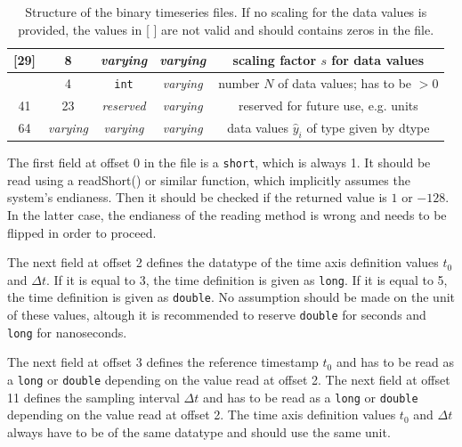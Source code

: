 \documentclass[a4paper,10pt]{article}
\begin{document}
\begin{table}[htbp]
\begin{tabular}{|c|c|c|c|c|}
    [29]    & 8                & \textit{varying}                 & \textit{varying}       & scaling factor $s$ for data values \\
    \hline                                                                                        
    [37]    & 4                & \texttt{int}                     & \textit{varying}       & number $N$ of data values; has to be $>0$ \\
    \hline
    41      & 23               & \textit{reserved}                & \textit{varying}       & reserved for future use, e.g. units \\
    \hline                                                                                        
    64      & \textit{varying} & \textit{varying}                 &\textit{varying}        & data values $\hat{y}_i$ of type given by dtype \\
    \hline
 \end{tabular}
 \caption{Structure of the binary timeseries files. If no scaling for the data values is provided, the values in [ ] are not valid and should contains zeros in the file.}
 \label{tab:structure}
\end{table}

The first field at offset 0 in the file is a \texttt{short}, which is always 1.
It should be read using a readShort() or similar function, which implicitly assumes the system's endianess.
Then it should be checked if the returned value is $1$ or $-128$. In the latter case,
the endianess of the reading method is wrong and needs to be flipped in order to proceed.

The next field at offset 2 defines the datatype of the time axis definition values $t_0$ and $\Delta t$.
If it is equal to 3, the time definition is given as \texttt{long}.
If it is equal to 5, the time definition is given as \texttt{double}.
No assumption should be made on the unit of these values, altough it is recommended to reserve \texttt{double} for seconds and
\texttt{long} for nanoseconds.

The next field at offset 3 defines the reference timestamp $t_0$ and has to be read as a \texttt{long} or \texttt{double}
depending on the value read at offset 2.
The next field at offset 11 defines the sampling interval $\Delta t$ and has to be read as a \texttt{long} or \texttt{double}
depending on the value read at offset 2.
The time axis definition values $t_0$ and $\Delta t$ always have to be of the same datatype and should use the same unit.
\end{document}
